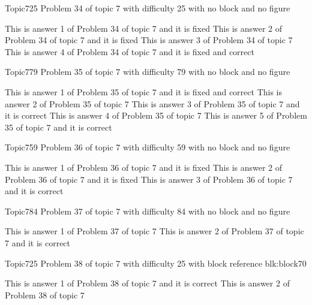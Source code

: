 \documentclass[master]{exam}
\begin{document}
\begin{problem}{Topic7}{25}
	Problem 34 of topic 7 with difficulty 25 with no block and no figure
	\begin{answers}
		\answer[fixed] This is answer 1 of Problem 34 of topic 7 and it is fixed
		\answer[fixed] This is answer 2 of Problem 34 of topic 7 and it is fixed
		\answer This is answer 3 of Problem 34 of topic 7 
		 This is answer 4 of Problem 34 of topic 7 and it is fixed and correct
	\end{answers}
\end{problem}

\begin{problem}{Topic7}{79}
	Problem 35 of topic 7 with difficulty 79 with no block and no figure
	\begin{answers}
		 This is answer 1 of Problem 35 of topic 7 and it is fixed and correct
		\answer This is answer 2 of Problem 35 of topic 7 
		\answer[correct] This is answer 3 of Problem 35 of topic 7 and it is correct
		\answer This is answer 4 of Problem 35 of topic 7 
		\answer[correct] This is answer 5 of Problem 35 of topic 7 and it is correct
	\end{answers}
\end{problem}

\begin{problem}{Topic7}{59}
	Problem 36 of topic 7 with difficulty 59 with no block and no figure
	\begin{answers}
		\answer[fixed] This is answer 1 of Problem 36 of topic 7 and it is fixed
		\answer[fixed] This is answer 2 of Problem 36 of topic 7 and it is fixed
		\answer[correct] This is answer 3 of Problem 36 of topic 7 and it is correct
	\end{answers}
\end{problem}

\begin{problem}{Topic7}{84}
	Problem 37 of topic 7 with difficulty 84 with no block and no figure
	\begin{answers}
		\answer This is answer 1 of Problem 37 of topic 7 
		\answer[correct] This is answer 2 of Problem 37 of topic 7 and it is correct
	\end{answers}
\end{problem}

\begin{problem}[requires=blk:block70]{Topic7}{25}
	Problem 38 of topic 7 with difficulty 25 with block reference blk:block70
	\begin{answers}
		\answer[correct] This is answer 1 of Problem 38 of topic 7 and it is correct
		\answer This is answer 2 of Problem 38 of topic 7 
	\end{answers}
\end{problem}
\end{document}
